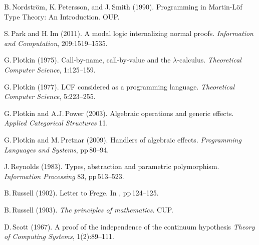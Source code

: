 \documentclass[11pt,twocolumn]{article}
\newcommand{\hide}[1]{}
\begin{document}
{\begin{thebibliography}{000}
B.\,Nordstr\"om, K.\,Petersson, and J.\,Smith (1990).
\newblock Programming in Martin-L\"of Type Theory: An Introduction.
\newblock OUP.

S.\,Park and H.\,Im (2011).
\newblock A modal logic internalizing normal proofs.
\newblock \emph{Information and Computation}, 209:1519--1535.

\hide{
\bibitem{Pierce}
B.\,Pierce (2002).
\newblock \emph{Types and programming languages}.
}

G.\,Plotkin (1975).
\newblock Call-by-name, call-by-value and the \mbox{$\lambda$-calculus}.
\newblock \emph{Theoretical Computer Science}, 1:125--159.

G.\,Plotkin (1977).
\newblock LCF considered as a programming language.
\newblock \emph{Theoretical Computer Science}, 5:223--255.

G.\,Plotkin and A.J.\,Power (2003).
\newblock Algebraic operations and generic effects.
\newblock \emph{Applied Categorical Structures} 11.

G.\,Plotkin and M.\,Pretnar (2009).
\newblock Handlers of algebraic effects.
\newblock \emph{Programming Languages and Systems}, pp\,80--94.


J.\,Reynolds (1983).
\newblock Types, abstraction and parametric polymorphism.
\newblock \emph{Information Processing} 83, pp\,513--523.


B.\,Russell (1902).
\newblock Letter to Frege. 
\newblock In \emph{\cite{vanHeijenoort}}, pp\,124--125. 

B.\,Russell (1903).
\newblock \emph{The principles of mathematics}.
\newblock CUP.

D.\,Scott (1967).
\newblock A proof of the independence of the continuum hypothesis
\newblock \emph{Theory of Computing Systems}, 1(2):89--111.


\end{thebibliography}}
\end{document}
